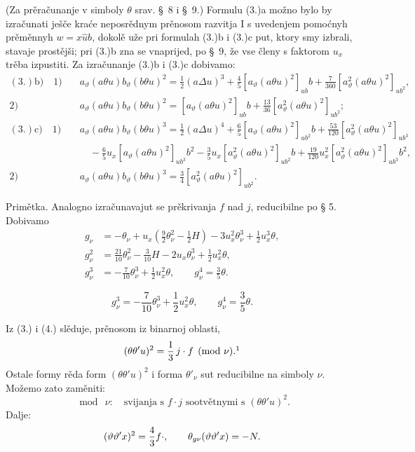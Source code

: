 \documentclass[11pt]{article}
\let\A\relax
\newcommand{\A}{\mathfrak A}
\begin{document}
(Za prěračunanje v simboly $\theta$ srav. \S\ 8 i \S\ 9.) Formulu (3.)a možno bylo by izračunati ješče kraće neposrědnym prěnosom razvitja I s uvedenjem pomoćnyh prěměnnyh $w=x\widehat{u}b$, dokolě uže pri formulah (3.)b i (3.)c put, ktory smy izbrali, stavaje prostějši; pri (3.)b zna se vnaprijed, po \S\ 9, že vse členy s faktorom $u_x$ trěba izpustiti. Za izračunanje (3.)b i (3.)c dobivamo:
\begingroup\scriptsize
\[
\begin{aligned}
(3.)\mathrm{b)}\quad 1)&\quad a_\vartheta(a\theta u)b_\vartheta(b\theta u)^2=\frac12(a\Delta u)^3+\frac45[a_\vartheta(a\theta u)^2]_{ub}b+\frac7{360}[a_\vartheta^2(a\theta u)^2]_{ub^2},\\
2)&\quad a_\vartheta(a\theta u)b_\vartheta(b\theta u)^2=[a_\vartheta(a\theta u)^2]_{ub}b+\frac{13}{36}[a_\vartheta^2(a\theta u)^2]_{ub^2};\\[.5em]
(3.)\mathrm{c)}\quad 1)&\quad a_\vartheta(a\theta u)b_\vartheta(b\theta u)^3=\frac12(a\Delta u)^4+\frac65[a_\vartheta(a\theta u)^2]_{ub^2}b+\frac{53}{120}[a_\vartheta^2(a\theta u)^2]_{ub^3}\\
&\qquad-\frac65u_x[a_\vartheta(a\theta u)^2]_{ub^3}b^2-\frac35u_x[a_\vartheta^2(a\theta u)^2]_{ub^2}b+\frac{19}{120}u_x^2[a_\vartheta^2(a\theta u)^2]_{ub^3}b^2,\\
2)&\quad a_\vartheta(a\theta u)b_\vartheta(b\theta u)^3=\frac34[a_\vartheta^2(a\theta u)^2]_{ub^2}.
\end{aligned}
\]
\endgroup

Primětka. Analogno izračunavajut se prěkrivanja $f$ nad $j$, reducibilne po § 5. Dobivamo
\[
\tag{4}
\begin{aligned}
g_\nu&=-\theta_\nu+u_x\left(\frac92\theta_\nu^2-\frac12H\right)-3u_x^2\theta_\nu^3+\frac12u_x^3\theta,\\
g_\nu^2&=\frac{21}{10}\theta_\nu^2-\frac3{10}H-2u_x\theta_\nu^3+\frac12u_x^2\theta,\\
g_\nu^3&=-\frac7{10}\theta_\nu^3+\frac12u_x^2\theta,\qquad g_\nu^4=\frac35\theta.
\end{aligned}
\]

\[
\tag{4}
g_\nu^3=-\frac7{10}\theta_\nu^3+\frac12u_x^2\theta,
\qquad
g_\nu^4=\frac35\theta.
\]

Iz (3.) i (4.) slěduje, prěnosom iz binarnoj oblasti,
\[
(\theta\theta'u)^2=\frac13\,j\cdot f\pmod{\nu}.\footnotemark
\]
Ostale formy rěda form $(\theta\theta'u)^2$ i forma $\theta'_\nu$ sut reducibilne na simboly $\nu$. Možemo zato zaměniti:
\[
\bmod\ \nu:\quad \text{svijanja s } f\cdot j
\text{ sootvětnymi s }(\theta\theta'u)^2.
\]
Dalje:
\[
(\vartheta\vartheta'x)^2=\frac43 f\cdot\A,
\qquad
\theta_{g\nu}(\vartheta\vartheta'x)=-N.
\]
\end{document}
